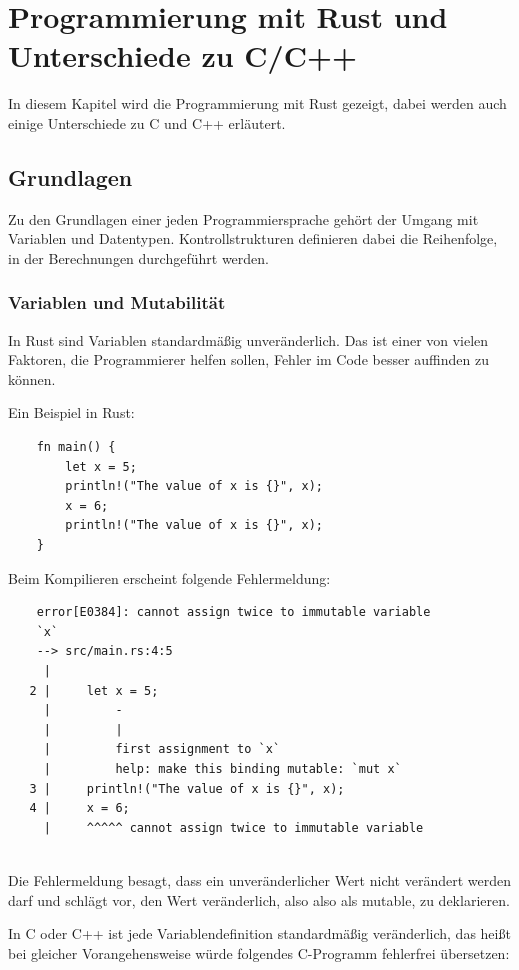 \chapter{Programmierung mit Rust und Unterschiede zu C/C++}

In diesem Kapitel wird die Programmierung mit Rust gezeigt, dabei werden auch einige Unterschiede zu C und C++ erläutert.


\section{Grundlagen}

Zu den Grundlagen einer jeden Programmiersprache gehört der Umgang mit Variablen und Datentypen. Kontrollstrukturen definieren dabei die Reihenfolge, in der Berechnungen durchgeführt werden.

\subsection{Variablen und Mutabilität}

In Rust sind Variablen standardmäßig unveränderlich. Das ist einer von vielen Faktoren, die Programmierer helfen sollen, Fehler im Code besser auffinden zu können. \cite{RustBook}

Ein Beispiel in Rust:

\begin{lstlisting}
    fn main() {
        let x = 5;
        println!("The value of x is {}", x);
        x = 6;
        println!("The value of x is {}", x);
    }
\end{lstlisting}

Beim Kompilieren erscheint folgende Fehlermeldung:

\begin{lstlisting}
    error[E0384]: cannot assign twice to immutable variable 
    `x`
    --> src/main.rs:4:5
     |
   2 |     let x = 5;
     |         -
     |         |
     |         first assignment to `x`
     |         help: make this binding mutable: `mut x`
   3 |     println!("The value of x is {}", x);
   4 |     x = 6;
     |     ^^^^^ cannot assign twice to immutable variable
   
\end{lstlisting}

Die Fehlermeldung besagt, dass ein unveränderlicher Wert nicht verändert werden darf und schlägt vor, den Wert veränderlich, also also als \glqq mutable\grqq{}, zu deklarieren.

In C oder C++ ist jede Variablendefinition standardmäßig veränderlich, das heißt bei gleicher Vorangehensweise würde folgendes C-Programm fehlerfrei übersetzen:

